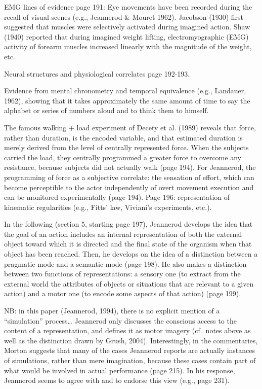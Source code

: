 \documentclass[a4paper,12pt,twoside,openright,oldfontcommands]{memoir}
\begin{document}
EMG lines of evidence page 191: Eye movements have been recorded during
the recall of visual scenes (e.g., Jeannerod \& Mouret 1962). Jacobson
(1930) first suggested that muscles were selectively activated during
imagined action. Shaw (1940) reported that during imagined weight
lifting, electromyographic (EMG) activity of forearm muscles increased
linearly with the magnitude of the weight, etc.

Neural structures and physiological correlates page 192-193.

Evidence from mental chronometry and temporal equivalence (e.g.,
Landauer, 1962), showing that it takes approximately the same amount of
time to say the alphabet or series of numbers aloud and to think them to
himself.

The famous walking + load experiment of Decety et al. (1989) reveals
that force, rather than duration, is the encoded variable, and that
estimated duration is merely derived from the level of centrally
represented force. When the subjects carried the load, they centrally
programmed a greater force to overcome any resistance, because subjects
did not actually walk (page 194). For Jeannerod, the programming of
force as a subjective correlate: the sensation of effort, which can
become perceptible to the actor independently of overt movement
execution and can be monitored experimentally (page 194). Page 196:
representation of kinematic regularities (e.g., Fitts' law, Viviani's
experiments, etc.).

In the following (section 5, starting page 197), Jeannerod develops the
idea that the goal of an action includes an internal representation of
both the external object toward which it is directed and the final state
of the organism when that object has been reached. Then, he develops on
the idea of a distinction between a pragmatic mode and a semantic mode
(page 198). He also makes a distinction between two functions of
representations: a sensory one (to extract from the external world the
attributes of objects or situations that are relevant to a given action)
and a motor one (to encode some aspects of that action) (page 199).

NB: in this paper (Jeannerod, 1994), there is no explicit mention of a
``simulation'' process\ldots{} Jeannerod only discusses the conscious
access to the content of a representation, and defines it as motor
imagery (cf.~notes above as well as the distinction drawn by Grush,
2004). Interestingly, in the commentaries, Morton suggests that many of
the cases Jeannerod reports are actually instances of simulations,
rather than mere imagination, because these cases contain part of what
would be involved in actual performance (page 215). In his response,
Jeannerod seems to agree with and to endorse this view (e.g., page 231).
\end{document}
